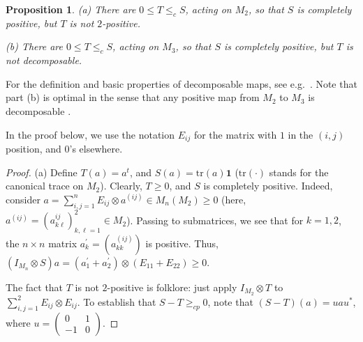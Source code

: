 \documentclass[12pt]{amsart}
\theoremstyle{plain}
\newtheorem{proposition}[theorem]{Proposition}
\theoremstyle{definition}
\renewcommand{\leq}{\leqslant}
\renewcommand{\geq}{\geqslant}\usepackage{amssymb}
\newcommand{\one}{\mathbf{1}}
\newcommand{\trace}{\mathrm{tr}}
\def \tr{{\mathrm{Tr}} }
\begin{document}
\begin{proposition}\label{prop:nogo}
(a) There are $0 \leq T \leq_c S$, acting on $M_2$, so that $S$ is completely positive,
but $T$ is not $2$-positive.

(b) There are $0 \leq T \leq_c S$, acting on $M_3$, so that $S$ is completely positive,
but $T$ is not decomposable.
\end{proposition}

For the definition and basic properties of decomposable maps, see e.g.~\cite{St82}.
Note that part (b) is optimal in the sense that any positive map from $M_2$ to $M_3$
is decomposable \cite{Wo}.

In the proof below, we use the notation $E_{ij}$ for the matrix with $1$ in the $(i,j)$
position, and $0$'s elsewhere.

\begin{proof}
(a) Define $T(a) = a^t$, and $S(a) = \trace(a) \one$
($\trace( \cdot )$ stands for the canonical trace on $M_2$).
Clearly, $T \geq 0$, and $S$ is completely
positive. Indeed, consider
$a = \sum_{i,j=1}^n E_{ij} \otimes a^{(ij)} \in M_n(M_2) \geq 0$
(here, $a^{(ij)} = (a^{ij}_{k\ell})_{k,\ell=1}^2 \in M_2$). 
Passing to submatrices, we see that
for $k=1,2$, the $n \times n$ matrix $a^\prime_k = (a^{(ij)}_{kk})$ is positive.
Thus, $(I_{M_n} \otimes S) a =
 (a^\prime_1 + a^\prime_2) \otimes (E_{11} + E_{22}) \geq 0$.

The fact that $T$ is not $2$-positive is folklore: just apply $I_{M_2} \otimes T$ to
$\sum_{i,j=1}^2 E_{ij} \otimes E_{ij}$.
To establish that $S-T \geq_{cp} 0$, note that $(S-T)(a) = u a u^*$,
where $u = \begin{pmatrix} 0 & 1 \\ -1 & 0 \end{pmatrix}$.



\end{proof}
\end{document}

